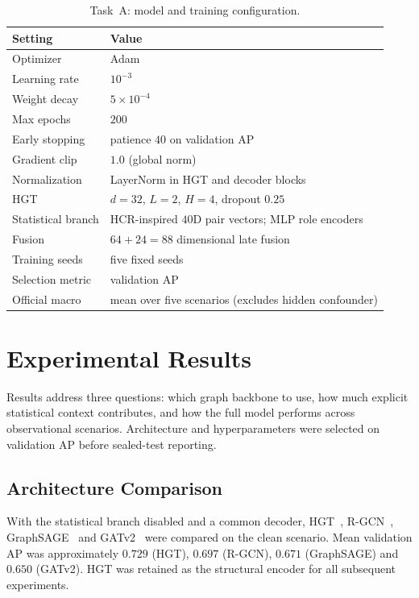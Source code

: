 \begin{table}[!ht]
\centering
\footnotesize
\setlength{\tabcolsep}{4pt}
\caption{Task~A: model and training configuration.}
\label{tab:taskA-train}
\begin{tabular}{ll}
\toprule
Setting & Value \\
\midrule
Optimizer & Adam~\cite{kingma2015adam} \\
Learning rate & $10^{-3}$ \\
Weight decay & $5\times 10^{-4}$ \\
Max epochs & $200$ \\
Early stopping & patience $40$ on validation AP \\
Gradient clip & $1.0$ (global norm) \\
Normalization & LayerNorm in HGT and decoder blocks~\cite{ba2016layernorm} \\
HGT & $d=32$, $L=2$, $H=4$, dropout $0.25$~\cite{hu2020hgt} \\
Statistical branch & HCR-inspired $40$D pair vectors; MLP role encoders \\
Fusion & $64+24=88$ dimensional late fusion \\
Training seeds & five fixed seeds \\
Selection metric & validation AP \\
Official macro & mean over five scenarios (excludes hidden confounder) \\
\bottomrule
\end{tabular}
\end{table}

\section{Experimental Results}
\label{sec:taskA-results}

Results address three questions: which graph backbone to use, how much explicit statistical context contributes, and how the full model performs across observational scenarios.
Architecture and hyperparameters were selected on validation AP before sealed-test reporting.

\subsection{Architecture Comparison}
\label{sec:taskA-stage-a}

With the statistical branch disabled and a common decoder, HGT~\cite{hu2020hgt}, R-GCN~\cite{schlichtkrull2018rgcn}, GraphSAGE~\cite{hamilton2017graphsage} and GATv2~\cite{brody2022gatv2} were compared on the clean scenario.
Mean validation AP was approximately $0.729$ (HGT), $0.697$ (R-GCN), $0.671$ (GraphSAGE) and $0.650$ (GATv2).
HGT was retained as the structural encoder for all subsequent experiments.

